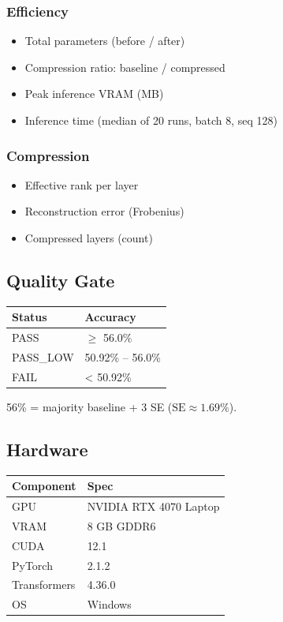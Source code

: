 \subsubsection{Efficiency}

\begin{itemize}
\item Total parameters (before / after)
\item Compression ratio: baseline / compressed
\item Peak inference VRAM (MB)
\item Inference time (median of 20 runs, batch 8, seq 128)

\end{itemize}
\subsubsection{Compression}

\begin{itemize}
\item Effective rank per layer
\item Reconstruction error (Frobenius)
\item Compressed layers (count)

\end{itemize}
\subsection{Quality Gate}

\begin{table}[H]
\centering
\small
\begin{tabular}{ll}
\toprule
\textbf{Status} & \textbf{Accuracy} \\
\midrule
PASS & $\ge$ 56.0\% \\
PASS\_LOW & 50.92\% -- 56.0\% \\
FAIL & < 50.92\% \\
\bottomrule
\end{tabular}
\end{table}

56\% = majority baseline + 3 SE ($\text{SE} \approx 1.69\%$).

\subsection{Hardware}

\begin{table}[H]
\centering
\small
\begin{tabular}{ll}
\toprule
\textbf{Component} & \textbf{Spec} \\
\midrule
GPU & NVIDIA RTX 4070 Laptop \\
VRAM & 8 GB GDDR6 \\
CUDA & 12.1 \\
PyTorch & 2.1.2 \\
Transformers & 4.36.0 \\
OS & Windows \\
\bottomrule
\end{tabular}
\end{table}

